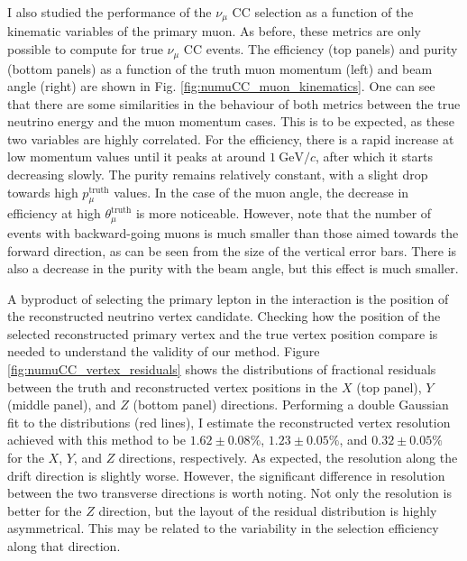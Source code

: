 I also studied the performance of the $\nu_{\mu}$ CC selection as a function of the kinematic variables of the primary muon. As before, these metrics are only possible to compute for true $\nu_{\mu}$ CC events. The efficiency (top panels) and purity (bottom panels) as a function of the truth muon momentum (left) and beam angle (right) are shown in Fig. \ref{fig:numuCC_muon_kinematics}. One can see that there are some similarities in the behaviour of both metrics between the true neutrino energy and the muon momentum cases. This is to be expected, as these two variables are highly correlated. For the efficiency, there is a rapid increase at low momentum values until it peaks at around $1~\mathrm{GeV}/c$, after which it starts decreasing slowly. The purity remains relatively constant, with a slight drop towards high $p_{\mu}^{\mathrm{truth}}$ values. In the case of the muon angle, the decrease in efficiency at high $\theta_{\mu}^{\mathrm{truth}}$ is more noticeable. However, note that the number of events with backward-going muons is much smaller than those aimed towards the forward direction, as can be seen from the size of the vertical error bars. There is also a decrease in the purity with the beam angle, but this effect is much smaller.

A byproduct of selecting the primary lepton in the interaction is the position of the reconstructed neutrino vertex candidate. Checking how the position of the selected reconstructed primary vertex and the true vertex position compare is needed to understand the validity of our method. Figure \ref{fig:numuCC_vertex_residuals} shows the distributions of fractional residuals between the truth and reconstructed vertex positions in the $X$ (top panel), $Y$ (middle panel), and $Z$ (bottom panel) directions. Performing a double Gaussian fit to the distributions (red lines), I estimate the reconstructed vertex resolution achieved with this method to be $1.62 \pm 0.08 \%$, $1.23 \pm 0.05 \%$, and $0.32 \pm 0.05 \%$ for the $X$, $Y$, and $Z$ directions, respectively. As expected, the resolution along the drift direction is slightly worse. However, the significant difference in resolution between the two transverse directions is worth noting. Not only the resolution is better for the $Z$ direction, but the layout of the residual distribution is highly asymmetrical. This may be related to the variability in the selection efficiency along that direction.

